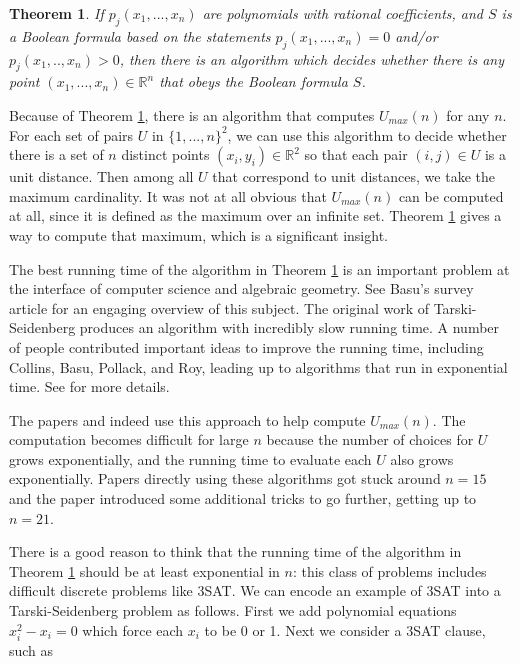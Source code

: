 \documentclass{amsart}
\newtheorem{theorem}[prop]{Theorem}
\newcommand{\RR}{\mathbb{R}}
\begin{document}
\begin{theorem} \label{thmtarseid} If $p_j(x_1, ..., x_n)$ are polynomials with rational coefficients, and $S$ is a Boolean formula based on the statements $p_j(x_1, ..., x_n) = 0$ and/or $p_j(x_1, .., x_n) > 0$, then there is an algorithm which decides whether there is any point $(x_1, ..., x_n) \in \RR^n$ that obeys the Boolean formula $S$.  \end{theorem}

\noindent Because of Theorem \ref{thmtarseid}, there is an algorithm that computes $U_{max}(n)$ for any $n$.  For each set of pairs $U$ in $\{1, ..., n \}^2$, we can use this algorithm to decide whether there is a set of $n$ distinct points $(x_i, y_i) \in \RR^2$ so that each pair $(i,j) \in U$ is a unit distance.  Then among all $U$ that correspond to unit distances, we take the maximum cardinality.
It was not at all obvious that $U_{max}(n)$ can be computed at all, since it is defined as the maximum over an infinite set.  Theorem \ref{thmtarseid} gives a way to compute that maximum, which is a significant insight.

The best running time of the algorithm in Theorem \ref{thmtarseid} is an important problem at the interface of computer science and algebraic geometry.   See Basu's survey article \cite{Ba} for an engaging overview of this subject.   The original work of Tarski-Seidenberg produces an algorithm with incredibly slow running time.   A number of people contributed important ideas to improve the running time,  including Collins,  Basu, Pollack, and Roy, leading up to algorithms that run in exponential time.   See \cite{Ba} for more details.  

The papers \cite{Ale} and \cite{Eng} indeed use this approach to help compute $U_{max}(n)$.   The computation becomes difficult for large $n$ because the number of choices for $U$ grows exponentially,  and the running time to evaluate each $U$ also grows exponentially.   Papers directly using these algorithms got stuck around $n=15$ and the paper \cite{Ale} introduced some additional tricks to go further, getting up to $n=21$.

There is a good reason to think that the running time of the algorithm in Theorem \ref{thmtarseid}
should be at least exponential in $n$: this class of problems includes difficult discrete problems like 3SAT.  We can encode an example of 3SAT into a Tarski-Seidenberg problem as follows.  First we add polynomial equations  $x_i^2 - x_i = 0$ which force each $x_i$ to be 0 or 1.  Next we consider a 3SAT clause, such as 
\end{document}
